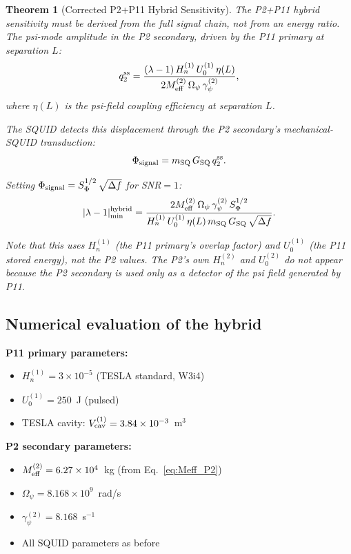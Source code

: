 \documentclass[11pt,twocolumn]{article}
\newcommand{\lam}{\lambda}
\newcommand{\Opsi}{\Omega_\psi}
\newcommand{\gpsi}{\gamma_\psi}
\newcommand{\Meff}{M_{\rm eff}}
\newcommand{\ee}[1]{\times 10^{#1}}
\newcommand{\Heff}{H_n}
\newcommand{\Vcav}{V_{\rm cav}}
\newtheorem{theorem}{Theorem}[section]
\theoremstyle{definition}
\theoremstyle{remark}
\begin{document}
\begin{theorem}[Corrected P2+P11 Hybrid Sensitivity]
\label{thm:hybrid_corrected}
The P2+P11 hybrid sensitivity must be derived from the full signal chain,
not from an energy ratio. The psi-mode amplitude in the P2 secondary,
driven by the P11 primary at separation $L$:
\begin{equation}
q_2^{\rm ss} = \frac{(\lam-1)\,\Heff^{(1)}\,U_0^{(1)}\,\eta(L)}
{2\Meff^{(2)}\,\Opsi\,\gpsi^{(2)}},
\label{eq:q2_hybrid}
\end{equation}
where $\eta(L)$ is the psi-field coupling efficiency at separation $L$.

The SQUID detects this displacement through the P2 secondary's
mechanical-SQUID transduction:
\begin{equation}
\Phi_{\rm signal} = m_{\rm SQ}\,G_{\rm SQ}\,q_2^{\rm ss}.
\label{eq:phi_signal}
\end{equation}

Setting $\Phi_{\rm signal} = S_\Phi^{1/2}\,\sqrt{\Delta f}$ for SNR$=1$:
\begin{equation}
|\lam-1|_{\rm min}^{\rm hybrid}
= \frac{2\Meff^{(2)}\,\Opsi\,\gpsi^{(2)}\,S_\Phi^{1/2}}
{\Heff^{(1)}\,U_0^{(1)}\,\eta(L)\,m_{\rm SQ}\,G_{\rm SQ}\,\sqrt{\Delta f}}.
\label{eq:hybrid_full}
\end{equation}

Note that this uses $\Heff^{(1)}$ (the P11 primary's overlap factor)
and $U_0^{(1)}$ (the P11 stored energy), not the P2 values. The P2's
own $\Heff^{(2)}$ and $U_0^{(2)}$ do not appear because the P2 secondary
is used only as a \emph{detector} of the psi field generated by P11.
\end{theorem}

\subsection{Numerical evaluation of the hybrid}
\label{sec:hybrid_numerical}

\textbf{P11 primary parameters:}
\begin{itemize}[nosep]
\item $\Heff^{(1)} = 3\ee{-5}$ (TESLA standard, W3i4)
\item $U_0^{(1)} = 250$~J (pulsed)
\item TESLA cavity: $\Vcav^{(1)} = 3.84\ee{-3}$~m$^3$
\end{itemize}

\textbf{P2 secondary parameters:}
\begin{itemize}[nosep]
\item $\Meff^{(2)} = 6.27\ee{4}$~kg (from Eq.~\ref{eq:Meff_P2})
\item $\Opsi = 8.168\ee{9}$~rad/s
\item $\gpsi^{(2)} = 8.168$~s$^{-1}$
\item All SQUID parameters as before
\end{itemize}
\end{document}

